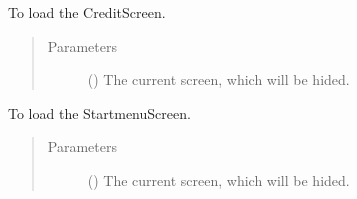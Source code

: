 \documentclass[letterpaper,10pt,english]{sphinxmanual}
\begin{document}
\begin{fulllineitems}
\begin{fulllineitems}
\end{fulllineitems}


\begin{fulllineitems}
\label{\detokenize{anoog.automation:anoog.automation.graphical_user_interface.GUI_App.load_screen_credits}}
\sphinxAtStartPar
To load the Credit\sphinxhyphen{}Screen.
\begin{quote}\begin{description}
\item[{Parameters}] \leavevmode
\sphinxAtStartPar
{} () \textendash{} The current screen, which will be hided.

\end{description}\end{quote}

\end{fulllineitems}


\begin{fulllineitems}
\label{\detokenize{anoog.automation:anoog.automation.graphical_user_interface.GUI_App.load_screen_main_menu}}
\sphinxAtStartPar
To load the Startmenu\sphinxhyphen{}Screen.
\begin{quote}\begin{description}
\item[{Parameters}] \leavevmode
\sphinxAtStartPar
{} () \textendash{} The current screen, which will be hided.

\end{description}\end{quote}


\end{fulllineitems}
\end{fulllineitems}
\end{document}
